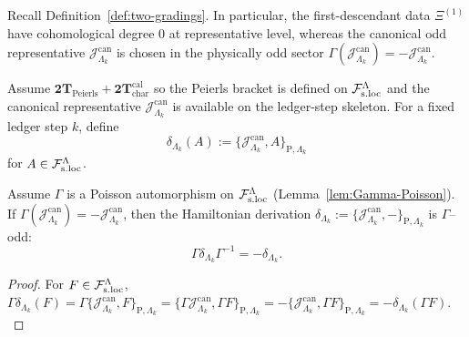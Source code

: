 \begin{remark}
\label{rem:two-gradings}
Recall Definition~\ref{def:two-gradings}.  In particular, the first-descendant
data \(\Xi^{(1)}\) have cohomological degree
\(0\) at representative level, whereas the canonical odd representative
\(\mathcal J^{\mathrm{can}}_{\Lambda_k}\) is chosen in the physically odd sector
\(\Gamma(\mathcal J^{\mathrm{can}}_{\Lambda_k})=-\mathcal J^{\mathrm{can}}_{\Lambda_k}\).
\end{remark}

\begin{definition}
\label{def:Main-delta}
Assume \(\mathbf{2T}_{\mathrm{Peierls}}+\mathbf{2T}_{\mathrm{char}}^{\mathrm{cal}}\) so the
Peierls bracket is defined on \(\mathcal F_{\mathrm{s.loc}}^\Lambda\) and the canonical representative
\(\mathcal J^{\mathrm{can}}_{\Lambda_k}\) is available on the ledger-step
skeleton. For a fixed ledger step \(k\), define
\[
\delta_{\Lambda_k}(A) := \{\mathcal J^{\mathrm{can}}_{\Lambda_k},A\}_{\mathrm P,\Lambda_k}
\]
for $A\in\mathcal F_{\mathrm{s.loc}}^\Lambda$.
\end{definition}

\begin{lemma}
\label{lem:Gamma-parity-of-delta}
Assume $\Gamma$ is a Poisson automorphism on $\mathcal F_{\mathrm{s.loc}}^\Lambda$ (Lemma~\ref{lem:Gamma-Poisson}).
If \(\Gamma(\mathcal J^{\mathrm{can}}_{\Lambda_k})=-\mathcal J^{\mathrm{can}}_{\Lambda_k}\),
then the Hamiltonian derivation
\(\delta_{\Lambda_k}:=\{\mathcal J^{\mathrm{can}}_{\Lambda_k},-\}_{\mathrm P,\Lambda_k}\)
is \(\Gamma\)--odd:
\[
\Gamma\delta_{\Lambda_k}\Gamma^{-1}=-\delta_{\Lambda_k}.
\]
\end{lemma}

\begin{proof}
For $F\in\mathcal F_{\mathrm{s.loc}}^\Lambda$,
$
\Gamma\delta_{\Lambda_k}(F)
=\Gamma\{\mathcal J^{\mathrm{can}}_{\Lambda_k},F\}_{\mathrm P,\Lambda_k}
=\{\Gamma\mathcal J^{\mathrm{can}}_{\Lambda_k},\Gamma F\}_{\mathrm P,\Lambda_k}
=-\{\mathcal J^{\mathrm{can}}_{\Lambda_k},\Gamma F\}_{\mathrm P,\Lambda_k}
=-\delta_{\Lambda_k}(\Gamma F).
$
\end{proof}

